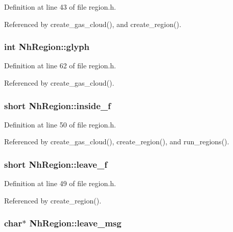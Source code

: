 Definition at line 43 of file region.\+h.



Referenced by create\+\_\+gas\+\_\+cloud(), and create\+\_\+region().

\hypertarget{structNhRegion_ad20e42df1758728ae40670635d7c6af5}{
\subsubsection[{glyph}]{\setlength{\rightskip}{0pt plus 5cm}int Nh\+Region\+::glyph}}\label{structNhRegion_ad20e42df1758728ae40670635d7c6af5}


Definition at line 62 of file region.\+h.



Referenced by create\+\_\+gas\+\_\+cloud().

\hypertarget{structNhRegion_a91718cb4cbceb766dad22d61e5b407fe}{
\subsubsection[{inside\+\_\+f}]{\setlength{\rightskip}{0pt plus 5cm}short Nh\+Region\+::inside\+\_\+f}}\label{structNhRegion_a91718cb4cbceb766dad22d61e5b407fe}


Definition at line 50 of file region.\+h.



Referenced by create\+\_\+gas\+\_\+cloud(), create\+\_\+region(), and run\+\_\+regions().

\hypertarget{structNhRegion_a667a81429ee1a23dbfc219c410706a48}{
\subsubsection[{leave\+\_\+f}]{\setlength{\rightskip}{0pt plus 5cm}short Nh\+Region\+::leave\+\_\+f}}\label{structNhRegion_a667a81429ee1a23dbfc219c410706a48}


Definition at line 49 of file region.\+h.



Referenced by create\+\_\+region().

\hypertarget{structNhRegion_abfaffe94b8e6f57d98abcb7e28d3bcb2}{
\subsubsection[{leave\+\_\+msg}]{ char$\ast$ Nh\+Region\+::leave\+\_\+msg}}\label{structNhRegion_abfaffe94b8e6f57d98abcb7e28d3bcb2}


